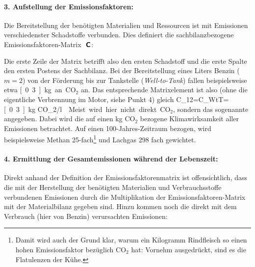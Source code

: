 \paragraph{3. Aufstellung der Emissionsfaktoren:} 
Die Bereitstellung der  ben\"otigten Materialien und Ressourcen
ist mit  Emissionen verschiedenster Schadstoffe verbunden.
Dies definiert die sachbilanzbezogene Emissionsfaktoren-Matrix ${\mbox{ \sf\textbf{C}}}$:


Die erste Zeile der Matrix betrifft also den ersten Schadstoff und
die erste Spalte den ersten Postens der Sachbilanz.
Bei der Bereitstellung eines Liters Benzin ($m=2$) von der F\"orderung bis zur
Tankstelle (\textit{Well-to-Tank}) fallen beispielsweise etwa
\unit[0.3]{kg} an CO$_2$ an. Das entsprechende Matrixelement ist also
(ohne die eigentliche Verbrennung im Motor, siehe Punkt 4)
gleich
\bdm
C_{12}=C_{WtT}=\unit[0.3]{kg CO_2/l}.
\edm
Meist wird hier nicht direkt CO$_2$,
  sondern das sogenannte  angegeben. Dabei
  wird die auf einen kg CO$_2$ bezogene Klimawirksamkeit aller
  Emissionen betrachtet. Auf einen 100-Jahres-Zeitraum
  bezogen, wird beispielsweise Methan 25-fach\footnote{Damit wird auch
    der Grund klar,
    warum  ein Kilogramm Rindfleisch so einen hohen Emissionsfaktor
    bez\"uglich CO$_2$ hat: Vornehm ausgedr\"uckt, sind es die
    Flatulenzen der  K\"uhe.} und Lachgas
  298 fach gewichtet. 

\paragraph{4. Ermittlung der Gesamtemissionen w\"ahrend der Lebenszeit:}

Direkt anhand der Definition der Emissionsfaktorenmatrix ist
offensichtlich, dass die mit der Herstellung der ben\"otigten
Materialien und Verbrauchsstoffe verbundenen Emissionen durch die
Multiplikation der  Emissionsfaktoren-Matrix mit der Materialbilanz 
gegeben sind. Hinzu kommen noch die direkt mit dem Verbrauch (hier von
Benzin) verursachten Emissionen:

